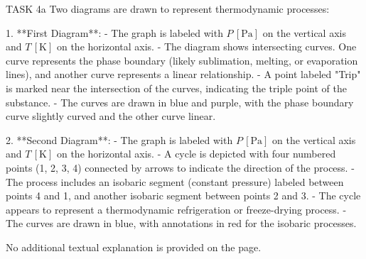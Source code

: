 TASK 4a  
Two diagrams are drawn to represent thermodynamic processes:

1. **First Diagram**:  
   - The graph is labeled with \( P \, [\text{Pa}] \) on the vertical axis and \( T \, [\text{K}] \) on the horizontal axis.  
   - The diagram shows intersecting curves. One curve represents the phase boundary (likely sublimation, melting, or evaporation lines), and another curve represents a linear relationship.  
   - A point labeled "Trip" is marked near the intersection of the curves, indicating the triple point of the substance.  
   - The curves are drawn in blue and purple, with the phase boundary curve slightly curved and the other curve linear.

2. **Second Diagram**:  
   - The graph is labeled with \( P \, [\text{Pa}] \) on the vertical axis and \( T \, [\text{K}] \) on the horizontal axis.  
   - A cycle is depicted with four numbered points (1, 2, 3, 4) connected by arrows to indicate the direction of the process.  
   - The process includes an isobaric segment (constant pressure) labeled between points 4 and 1, and another isobaric segment between points 2 and 3.  
   - The cycle appears to represent a thermodynamic refrigeration or freeze-drying process.  
   - The curves are drawn in blue, with annotations in red for the isobaric processes.  

No additional textual explanation is provided on the page.